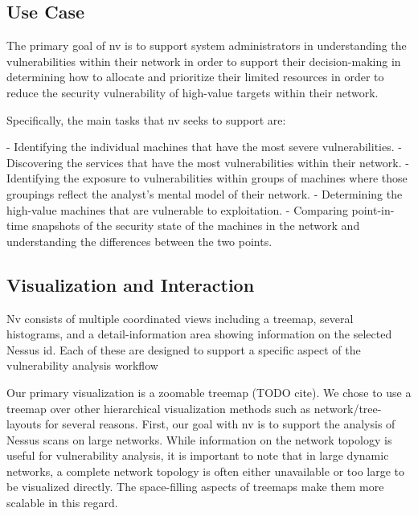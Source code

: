 \documentclass{acm_proc_article-sp}
\begin{document}
\subsection{Use Case}

% 


The primary goal of nv is to support system administrators in understanding the
vulnerabilities within their network in order to support their
decision-making in determining how to allocate and prioritize their
limited resources in order to reduce the security vulnerability of
high-value targets within their network.

Specifically, the main tasks that nv seeks to support are:

- Identifying the individual machines that have the most severe vulnerabilities.
- Discovering the services that have the most vulnerabilities within
their network.
- Identifying the exposure to vulnerabilities within groups of
machines where those groupings reflect the analyst's mental model of
their network.
- Determining the high-value machines that are vulnerable to exploitation.
- Comparing point-in-time snapshots of the security state of the
machines in the network and understanding the differences between the
two points.

\subsection{Visualization and Interaction}
Nv consists of multiple coordinated views including a treemap, several histograms, and a detail-information area showing information on the selected Nessus id.
Each of these are designed to support a specific aspect of the vulnerability analysis workflow

Our primary visualization is a zoomable treemap (TODO cite).
We chose to use a treemap over other hierarchical visualization methods such as network/tree-layouts for several reasons.
First, our goal with nv is to support the analysis of Nessus scans on large networks.
While information on the network topology is useful for vulnerability analysis, it is important to note that in large dynamic networks, a complete network topology is often either unavailable or too large to be visualized directly.
The space-filling aspects of treemaps make them more scalable in this regard.
\end{document}
